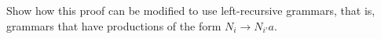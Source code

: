 Show how this proof can be modified to use left-recursive grammars,
that is, grammars that have productions of the form $N_i\rightarrow
N_{i'}a$.
